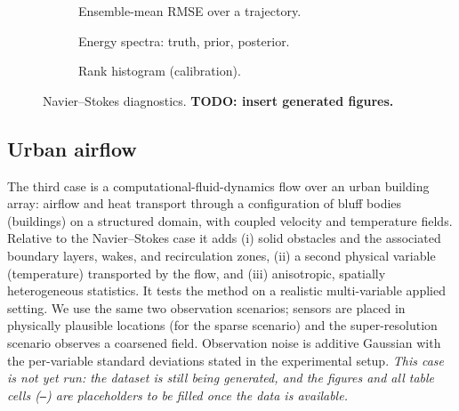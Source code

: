 \begin{figure}[ht]
    \centering
    \begin{subfigure}{0.32\linewidth}\centering
        \caption{Ensemble-mean RMSE over a trajectory.}\label{fig:ns_rmse}
    \end{subfigure}\hfill
    \begin{subfigure}{0.32\linewidth}\centering
        \caption{Energy spectra: truth, prior, posterior.}\label{fig:ns_spectrum}
    \end{subfigure}\hfill
    \begin{subfigure}{0.32\linewidth}\centering
        \caption{Rank histogram (calibration).}\label{fig:ns_rank}
    \end{subfigure}
    \caption{Navier--Stokes diagnostics. \textbf{TODO: insert generated figures.}}
    \label{fig:ns_diagnostics}
\end{figure}

\subsection{Urban airflow}
\label{subsec:results_urban}
The third case is a computational-fluid-dynamics flow over an urban building array: airflow and heat transport through a configuration of bluff bodies (buildings) on a structured domain, with coupled velocity and temperature fields. Relative to the Navier--Stokes case it adds (i) solid obstacles and the associated boundary layers, wakes, and recirculation zones, (ii) a second physical variable (temperature) transported by the flow, and (iii) anisotropic, spatially heterogeneous statistics. It tests the method on a realistic multi-variable applied setting. We use the same two observation scenarios; sensors are placed in physically plausible locations (for the sparse scenario) and the super-resolution scenario observes a coarsened field. Observation noise is additive Gaussian with the per-variable standard deviations stated in the experimental setup. \emph{This case is not yet run: the dataset is still being generated, and the figures and all table cells (\texttt{--}) are placeholders to be filled once the data is available.}

